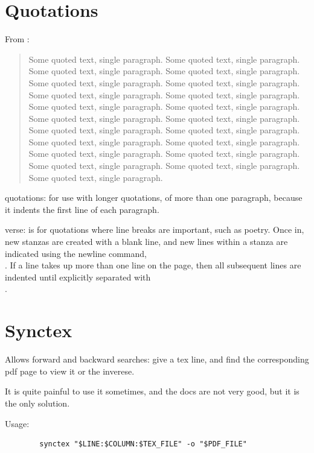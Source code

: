 \documentclass[12pt]{article}
\begin{document}
\section{Quotations}\label{quotations}

    From \cite{Aa00}:

    \begin{quote}
        Some quoted text, single paragraph. Some quoted text, single paragraph. Some quoted text, single paragraph.
        Some quoted text, single paragraph. Some quoted text, single paragraph. Some quoted text, single paragraph.
        Some quoted text, single paragraph. Some quoted text, single paragraph. Some quoted text, single paragraph.
        Some quoted text, single paragraph. Some quoted text, single paragraph. Some quoted text, single paragraph.
        Some quoted text, single paragraph. Some quoted text, single paragraph. Some quoted text, single paragraph.
        Some quoted text, single paragraph. Some quoted text, single paragraph. Some quoted text, single paragraph.
        Some quoted text, single paragraph. Some quoted text, single paragraph. Some quoted text, single paragraph.
    \end{quote}

    quotations:
        for use with longer quotations, of more than one paragraph, because it indents the first line of each paragraph.

    verse:
        is for quotations where line breaks are important, such as poetry. Once in, new stanzas are created with a blank line, and new lines within a stanza are indicated using the newline command, \\. If a line takes up more than one line on the page, then all subsequent lines are indented until explicitly separated with \\.

\section{Synctex}\label{synctex}

    Allows forward and backward searches: give a tex line, and find the corresponding pdf page to view it or the inverese.

    It is quite painful to use it sometimes, and the docs are not very good, but it is the only solution.

    Usage:

    \begin{lstlisting}
        synctex "$LINE:$COLUMN:$TEX_FILE" -o "$PDF_FILE"
    \end{lstlisting}
\end{document}
